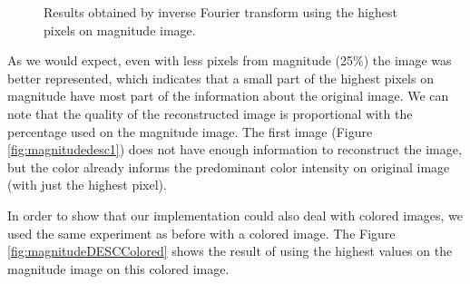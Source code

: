 \documentclass[12pt,a4paper]{article}
\begin{document}
\begin{itemize}
\begin{figure}[!h]
{{			}
			\label{fig:magnitudedesc50}
		}
		\quad
		
		\caption{Results obtained by inverse Fourier transform using the highest pixels on magnitude image.}
		\label{fig:magnitudeDESC}
	\end{figure}
	
	As we would expect, even with less pixels from magnitude (25\%) the image was better represented, which indicates that a small part of the highest pixels on magnitude have most part of the information about the original image.  We can note that the quality of the reconstructed image is proportional with the percentage used on the magnitude image. The first image (Figure \ref{fig:magnitudedesc1}) does not have enough information to reconstruct the image, but the color already informs the predominant color intensity on original image (with just the highest pixel). \\
	
\end{itemize}

\newpage

In order to show that our implementation could also deal with colored images, we used the same experiment as before with a colored image. The Figure \ref{fig:magnitudeDESCColored} shows the result of using the highest values on the magnitude image on this colored image. \\
\end{document}
